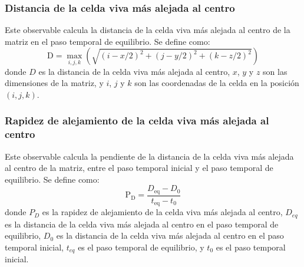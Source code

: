 \subsubsection{Distancia de la celda viva más alejada al centro}\label{subsubsec:distancia-de-la-celda-viva-mas-alejada-al-centro}
Este observable calcula la distancia de la celda viva más alejada al centro de la matriz
en el paso temporal de equilibrio.
Se define como:
\begin{equation}
    \text{D} = \max_{i, j, k} \left( \sqrt{(i - x/2)^2 + (j - y/2)^2 + (k - z/2)^2} \right)
    \label{eq:distancia-celda-viva-mas-alejada-al-centro}
\end{equation}
donde $D$ es la distancia de la celda viva más alejada al centro, $x$, $y$ y $z$ son las dimensiones de la matriz,
y $i$, $j$ y $k$ son las coordenadas de la celda en la posición $(i, j, k)$.

\subsubsection{Rapidez de alejamiento de la celda viva más alejada al centro}\label{subsubsec:rapidez-de-alejamiento-de-la-celda-viva-mas-alejada-al-centro}
Este observable calcula la pendiente de la distancia de la celda viva más alejada al centro de la matriz,
entre el paso temporal inicial y el paso temporal de equilibrio.
Se define como:
\begin{equation}
    \text{P}_{\text{D}} = \frac{D_{\text{eq}} - D_{0}}{t_{\text{eq}} - t_{0}}
    \label{eq:rapidez-alejamiento-celda-viva-mas-alejada-al-centro}
\end{equation}
donde $P_{D}$ es la rapidez de alejamiento de la celda viva más alejada al centro, $D_{eq}$ es la
distancia de la celda viva más alejada al centro en el paso temporal de equilibrio, $D_{0}$ es la
distancia de la celda viva más alejada al centro en el paso temporal inicial, $t_{eq}$ es el paso
temporal de equilibrio, y $t_{0}$ es el paso temporal inicial.








